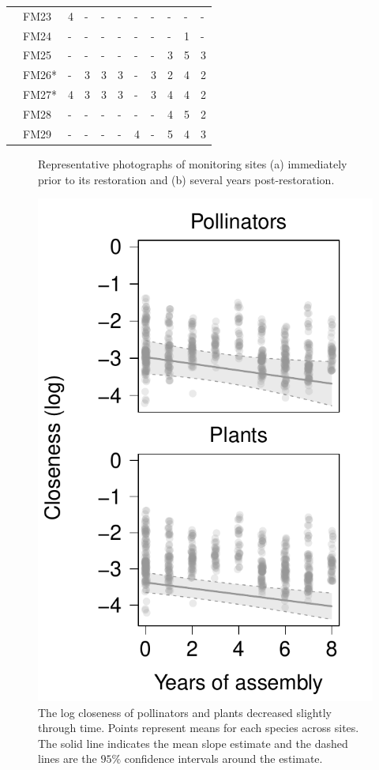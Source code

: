 \documentclass[12pt]{article}
\begin{document}
\begin{table}
\begin{tabular}{lllllllllll}
    &FM23 & 4 & - & - & - & - & - & - & - & -\\
    &FM24 & - & - & - & - & - & - & - & 1 & -\\
    &FM25 & - & - & - & - & - & - & 3 & 5 & 3\\
    &FM26* & - & 3 & 3 & 3 & - & 3 & 2 & 4 & 2\\
    &FM27* & 4 & 3 & 3 & 3 & - & 3 & 4 & 4 & 2\\
    &FM28 & - & - & - & - & - & - & 4 & 5 & 2\\
    &FM29 & - & - & - & - & 4 & - & 5 & 4 & 3\\
    \hline
  \end{tabular}
  \label{tab:controls}
\end{table}
\clearpage


\begin{figure}[!tbp]
  \centering
  \hfill
  \caption{Representative photographs of monitoring sites (a)
    immediately prior to its restoration and (b) several years
    post-restoration.}
\end{figure}
\clearpage

\begin{figure}
  \centering
  \includegraphics[width=.6\textwidth]{../analysis/speciesLevel/figures/closenessPanel.pdf}
  \caption{The log closeness of pollinators and plants decreased
    slightly through time. Points represent means for each species
    across sites. The solid line indicates the mean slope estimate and
    the dashed lines are the $95\%$ confidence intervals around the
    estimate.}
  \label{fig:closeness}
\end{figure}
\clearpage
\end{document}
